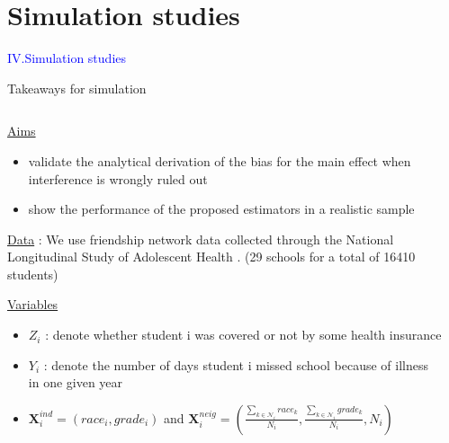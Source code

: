\documentclass[notes,11pt, aspectratio=169]{beamer}
\begin{document}
\section{Simulation studies}
\begin{transitionframe}
  \begin{center}
    { \Huge \textcolor{blue}{IV.Simulation studies}}
  \end{center}
\end{transitionframe}

\begin{frame}{Takeaways for simulation}
\begin{columns}[T] %
\begin{column}{.9\textwidth}
\begin{wideitemize}
    \item \underline{Aims}
    \begin{itemize}
        \item validate the analytical derivation of the bias for the main effect when interference is wrongly ruled out
        \item show the performance of the proposed estimators in a realistic sample
    \end{itemize}
    \item \underline{Data} : We use friendship network data collected through the National Longitudinal Study of Adolescent Health . (29 schools for a total of 16410 students) 
    \item \underline{Variables} 
    \begin{itemize}
        \item $Z_i$ : denote whether student i  was covered  or not by some health insurance
        \item $Y_i$ : denote the number of days student i missed school because of illness in one given year
        \item $\mathbf{X}_{i}^{ind}=(race_i,grade_i)$ and $\mathbf{X}_{i}^{neig}=(\frac{\sum_{k \in \mathcal{N}_i}race_k}{N_i} , \frac{\sum_{k \in \mathcal{N}_i}grade_k}{N_i} , N_i)$
    \end{itemize}
\end{wideitemize}
\end{column}%
\hfill%
\begin{column}{.38\textwidth}

  \vspace{20pt}
  
  \vspace{20pt}
  
\end{column}%
\end{columns}
\end{frame}
\end{document}
